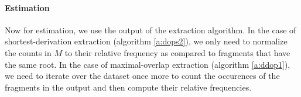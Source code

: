 \paragraph{Estimation}
Now for estimation, we use the output of the extraction algorithm. In the case of shortest-derivation extraction (algorithm \ref{a:dops2}), we only need to normalize the counts in $M$ to their relative frequency as compared to fragments that have the same root. In the case of maximal-overlap extraction (algorithm \ref{a:ddop1}), we need to iterate over the dataset once more to count the occurences of the fragments in the output and then compute their relative frequencies.






